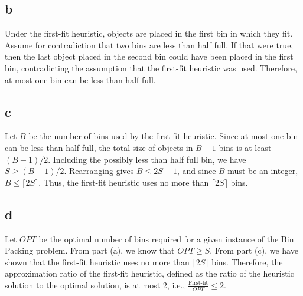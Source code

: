 \documentclass{article}
\begin{document}
\subsection{b}
Under the first-fit heuristic, objects are placed in the first bin in which they fit. Assume for contradiction that two bins are less than half full. If that were true, then the last object placed in the second bin could have been placed in the first bin, contradicting the assumption that the first-fit heuristic was used. Therefore, at most one bin can be less than half full.

\subsection{c}
Let $B$ be the number of bins used by the first-fit heuristic. Since at most one bin can be less than half full, the total size of objects in $B-1$ bins is at least $(B-1)/2$. Including the possibly less than half full bin, we have $S \geq (B-1)/2$. Rearranging gives $B \leq 2S + 1$, and since $B$ must be an integer, $B \leq \lceil 2S \rceil$. Thus, the first-fit heuristic uses no more than $\lceil 2S \rceil$ bins.

\subsection{d}
Let $OPT$ be the optimal number of bins required for a given instance of the Bin Packing problem. From part (a), we know that $OPT \geq S$. From part (c), we have shown that the first-fit heuristic uses no more than $\lceil 2S \rceil$ bins. Therefore, the approximation ratio of the first-fit heuristic, defined as the ratio of the heuristic solution to the optimal solution, is at most 2, i.e., $\frac{\text{First-fit}}{OPT} \leq 2$.
\end{document}
